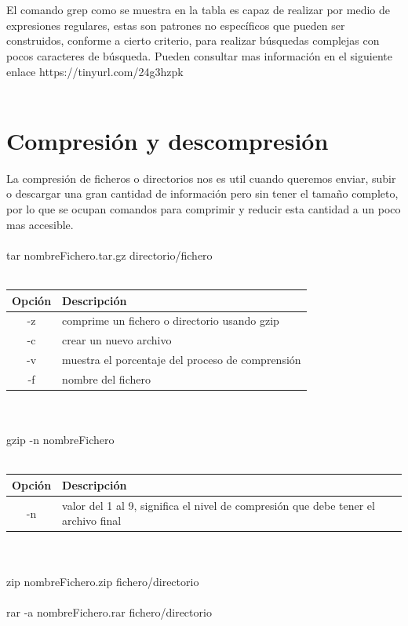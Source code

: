 \documentclass[10pt,a4paper,titlepage]{article}
\begin{document}
	\\
	\\
	El comando grep como se muestra en la tabla es capaz de realizar por medio de expresiones regulares, estas son patrones no específicos que pueden ser construidos, conforme a cierto criterio, para realizar búsquedas complejas con pocos caracteres de búsqueda. Pueden consultar mas información en el siguiente enlace https://tinyurl.com/24g3hzpk
	\\
	\\

	\section*{Compresión y descompresión}
	La compresión de ficheros o directorios nos es util cuando queremos enviar, subir o descargar una gran cantidad de información pero sin tener el tamaño completo, por lo que se ocupan comandos para comprimir y reducir esta cantidad a un poco mas accesible.
	\\
	\\
	tar nombreFichero.tar.gz directorio/fichero
	\\
	\\
	\begin{tabular}{|c|p{8cm}|}
		\hline
		Opción & Descripción \\
		\hline
		-z & comprime un fichero o directorio usando gzip \\
		\hline
		-c & crear un nuevo archivo \\
		\hline
		-v & muestra el porcentaje del proceso de comprensión \\
		\hline
		-f & nombre del fichero \\
		\hline
	\end{tabular}
	\\
	\\
	gzip -n nombreFichero
	\\
	\\
	\begin{tabular}{|c|p{8cm}|}
		\hline
		Opción & Descripción \\
		\hline
		-n & valor del 1 al 9, significa el nivel de compresión que debe tener el archivo final \\
		\hline
	\end{tabular}
	\\
	\\
	zip nombreFichero.zip fichero/directorio
	\\
	\\
	rar -a nombreFichero.rar fichero/directorio
\end{document}
